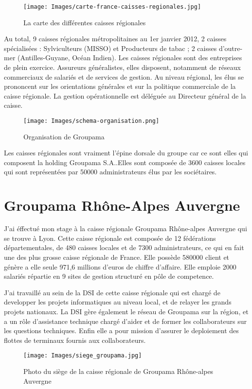 \begin{figure}[h]
\begin{center}
\texttt{[image: Images/carte-france-caisses-regionales.jpg]}
\caption{La carte des différentes caisses régionales}
\label{La carte des différentes caisses régionales}
\end{center}
\end{figure}

Au total, 9 caisses régionales métropolitaines au 1er janvier 2012, 2
caisses spécialisées : Sylviculteurs (MISSO) et Producteurs de tabac ;
2 caisses d’outre-mer (Antilles-Guyane, Océan Indien). Les caisses
régionales sont des entreprises de plein exercice.  Assureurs
généralistes, elles disposent, notamment de réseaux commerciaux de
salariés et de services de gestion.  Au niveau régional, les élus se
prononcent sur les orientations générales et sur la politique
commerciale de la caisse régionale.  La gestion opérationnelle est
déléguée au Directeur général de la caisse.

\begin{figure}[h]
\begin{center}
\texttt{[image: Images/schema-organisation.png]}
\caption{Organisation de Groupama}
\label{Organisation de Groupama}
\end{center}
\end{figure}

Les caisses régionales sont vraiment l'épine dorsale du groupe car ce
sont elles qui composent la holding Groupama S.A..Elles sont composée
de 3600 caisses locales qui sont représentées par 50000
administrateurs élus par les sociétaires.

\section{Groupama Rhône-Alpes Auvergne}

J'ai éffectué mon stage à la caisse régionale Groupama Rhône-alpes
Auvergne qui se trouve à Lyon.  Cette caisse régionale est composée de
12 fédérations départementales, de 480 caisses locales et de 7300
administrateurs, ce qui en fait une des plus grosse caisse régionale
de France. Elle possède 580000 client et génère a elle seule 971,6
millions d'euros de chiffre d'affaire.  Elle emploie 2000 salariés
répartie en 9 sites de gestion structuré en pôle de competence.

J'ai travaillé au sein de la DSI de cette caisse régionale qui est
chargé de developper les projets informatiques au niveau local, et de
relayer les grands projets nationaux.  La DSI gère également le réseau
de Groupama sur la région, et a un rôle d'assistance technique chargé
d'aider et de former les collaborateurs sur les questions techniques.
Enfin elle a pour mission d'assurer le deploiement des flottes de
terminaux fournis aux collaborateurs.
 
\begin{figure}[h]
\begin{center}
\texttt{[image: Images/siege\_groupama.jpg]}
\caption{Photo du siège de la caisse régionale de Groupama Rhône-alpes Auvergne}
\label{Photo du siège de la caisse régionale de Groupama Rhône-alpes Auvergne}
\end{center}
\end{figure} 


